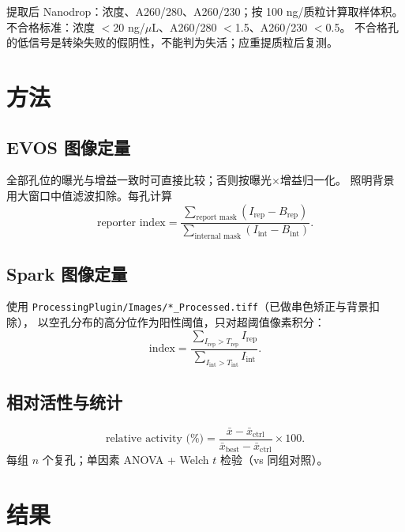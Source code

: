 \documentclass[UTF8, a4paper, 11pt]{ctexart}
\begin{document}
{{提取后 Nanodrop：浓度、A260/280、A260/230；按 100 ng/质粒计算取样体积。
不合格标准：浓度 $<$20 ng/$\mu$L、A260/280 $<$1.5、A260/230 $<$0.5。
不合格孔的低信号是转染失败的假阴性，不能判为失活；应重提质粒后复测。}}

\section{方法}

\subsection{EVOS 图像定量}

全部孔位的曝光与增益一致时可直接比较；否则按曝光$\times$增益归一化。
照明背景用大窗口中值滤波扣除。每孔计算
\begin{equation}
  \text{reporter index}=
  \frac{\sum_{\text{report mask}}\left(I_{\text{rep}}-B_{\text{rep}}\right)}
       {\sum_{\text{internal mask}}\left(I_{\text{int}}-B_{\text{int}}\right)} .
\end{equation}

\subsection{Spark 图像定量}

使用 \texttt{ProcessingPlugin/Images/*\_Processed.tiff}（已做串色矫正与背景扣除），
以空孔分布的高分位作为阳性阈值，只对超阈值像素积分：
\begin{equation}
  \text{index}=\frac{\sum_{I_{\text{rep}}>T_{\text{rep}}} I_{\text{rep}}}
                     {\sum_{I_{\text{int}}>T_{\text{int}}} I_{\text{int}}} .
\end{equation}

\subsection{相对活性与统计}

\begin{equation}
  \text{relative activity (\%)}=
  \frac{\bar{x}-\bar{x}_{\text{ctrl}}}{\bar{x}_{\text{best}}-\bar{x}_{\text{ctrl}}}\times100 .
\end{equation}
每组 $n$ 个复孔；单因素 ANOVA + Welch $t$ 检验（vs 同组对照）。

\section{结果}
\end{document}
